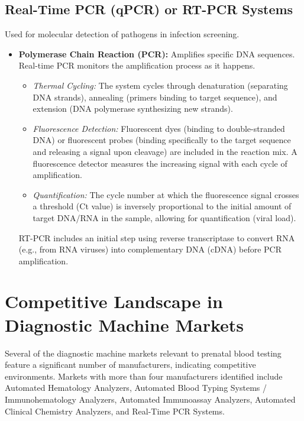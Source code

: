 \documentclass{article}
\begin{document}
\subsection{Real-Time PCR (qPCR) or RT-PCR Systems}
Used for molecular detection of pathogens in infection screening.
\begin{itemize}
    \item \textbf{Polymerase Chain Reaction (PCR):} Amplifies specific DNA sequences. Real-time PCR monitors the amplification process as it happens.
    \begin{itemize}
        \item \textit{Thermal Cycling:} The system cycles through denaturation (separating DNA strands), annealing (primers binding to target sequence), and extension (DNA polymerase synthesizing new strands).
        \item \textit{Fluorescence Detection:} Fluorescent dyes (binding to double-stranded DNA) or fluorescent probes (binding specifically to the target sequence and releasing a signal upon cleavage) are included in the reaction mix. A fluorescence detector measures the increasing signal with each cycle of amplification.
        \item \textit{Quantification:} The cycle number at which the fluorescence signal crosses a threshold (Ct value) is inversely proportional to the initial amount of target DNA/RNA in the sample, allowing for quantification (viral load).
    \end{itemize}
    RT-PCR includes an initial step using reverse transcriptase to convert RNA (e.g., from RNA viruses) into complementary DNA (cDNA) before PCR amplification.

\end{itemize}

\section{Competitive Landscape in Diagnostic Machine Markets}

Several of the diagnostic machine markets relevant to prenatal blood testing feature a significant number of manufacturers, indicating competitive environments. Markets with more than four manufacturers identified include Automated Hematology Analyzers, Automated Blood Typing Systems / Immunohematology Analyzers, Automated Immunoassay Analyzers, Automated Clinical Chemistry Analyzers, and Real-Time PCR Systems.
\end{document}
